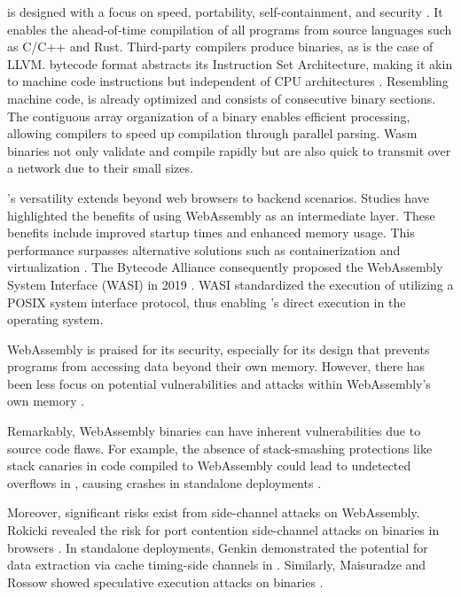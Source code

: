 \Wasm is designed with a focus on speed, portability, self-containment, and security \cite{Haas_2017}. 
It enables the ahead-of-time compilation of all programs from source languages such as C/C++ and Rust. 
Third-party compilers produce \Wasm binaries, as is the case of LLVM. 
\Wasm bytecode format abstracts its Instruction Set Architecture, making it akin to machine code instructions but independent of CPU architectures \cite{wasm_spec}. 
Resembling machine code, \Wasm is already optimized and consists of consecutive binary sections. 
The contiguous array organization of a \Wasm binary enables efficient processing, allowing compilers to speed up compilation through parallel parsing. 
Wasm binaries not only validate and compile rapidly but are also quick to transmit over a network due to their small sizes.

\Wasm's versatility extends beyond web browsers to backend scenarios. 
Studies have highlighted the benefits of using WebAssembly as an intermediate layer. 
These benefits include improved startup times and enhanced memory usage. 
This performance surpasses alternative solutions such as containerization and virtualization \cite{pMendkiServerless, 1244493Jacobsson}. 
The Bytecode Alliance consequently proposed the WebAssembly System Interface (WASI) in 2019 \cite{bytecodealliance, WASI}.
WASI standardized the execution of \Wasm utilizing a POSIX system interface protocol, thus enabling \Wasm's direct execution in the operating system.


WebAssembly is praised for its security, especially for its design that prevents programs from accessing data beyond their own memory. 
However, there has been less focus on potential vulnerabilities and attacks within WebAssembly's own memory \cite{usenixWasm2020}.

Remarkably, WebAssembly binaries can have inherent vulnerabilities due to source code flaws. 
For example, the absence of stack-smashing protections like stack canaries in code compiled to WebAssembly could lead to undetected overflows in \Wasm, causing crashes in standalone deployments  \cite{DeRoover2022} .


Moreover, significant risks exist from side-channel attacks on WebAssembly.
Rokicki \etal revealed the risk for port contention side-channel attacks on \Wasm binaries in browsers \cite{10.1145/3488932.3517411}. 
In standalone deployments, Genkin \etal demonstrated the potential for data extraction via cache timing-side channels in \Wasm \cite{Genkin2018DrivebyKC}. 
Similarly, Maisuradze and Rossow showed speculative execution attacks on \Wasm binaries \cite{ret2spec}. 


